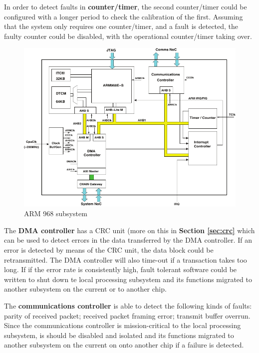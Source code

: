 \documentclass[a4paper, 11pt]{article}
\begin{document}
In order to detect faults in \textbf{counter/timer}, the second counter/timer could be configured with a longer period to check the calibration of the first. Assuming that the system only requires one counter/timer, and a fault is detected, the faulty counter could be disabled, with the operational counter/timer taking over.

\begin{figure}[t]
	\centering
	\includegraphics[width=0.7\linewidth]{images/arm968_subsystem.pdf}
	\caption{ARM 968 subsystem}
	\label{fig:arm968}
\end{figure}

The \textbf{DMA controller} has a CRC unit (more on this in \textbf{Section \ref{sec:crc}} which can be used to detect errors in the data transferred by the DMA controller. If an error is detected by means of the CRC unit, the data block could be retransmitted. The DMA controller will also time-out if a transaction takes too long. If if the error rate is consistently high, fault tolerant software could be written to shut down te local processing subsystem and its functions migrated to another subsystem on the current or to another chip.

The \textbf{communications controller} is able to detect the following kinds of faults:
parity of received packet; received packet framing error; transmit buffer overrun. Since the communications controller is mission-critical to the local processing subsystem, is should be disabled and isolated and its functions migrated to another subsystem on the current on onto another chip if a failure is detected.
\end{document}
